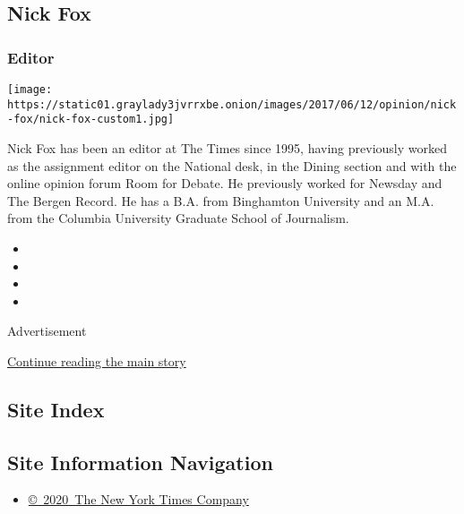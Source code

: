 \begin{itemize}
{  \subsection{Nick Fox}\label{nick-fox}}

  \hypertarget{editor}{%
  \subsubsection{Editor}\label{editor}}

  \texttt{[image: https://static01.graylady3jvrrxbe.onion/images/2017/06/12/opinion/nick-fox/nick-fox-custom1.jpg]}

  Nick Fox has been an editor at The Times since 1995, having previously
  worked as the assignment editor on the National desk, in the Dining
  section and with the online opinion forum Room for Debate. He
  previously worked for Newsday and The Bergen Record. He has a B.A.
  from Binghamton University and an M.A. from the Columbia University
  Graduate School of Journalism.
\end{itemize}

\begin{itemize}
\item
\item
\item
\item
\end{itemize}

Advertisement

\protect\hyperlink{after-bottom}{Continue reading the main story}

\hypertarget{site-index}{%
\subsection{Site Index}\label{site-index}}

\hypertarget{site-information-navigation}{%
\subsection{Site Information
Navigation}\label{site-information-navigation}}

\begin{itemize}
\tightlist
\item
  \href{https://help.nytimes3xbfgragh.onion/hc/en-us/articles/115014792127-Copyright-notice}{©~2020~The
  New York Times Company}
\end{itemize}

